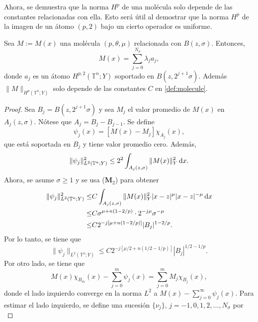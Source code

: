 Ahora, se demuestra que la norma $H^p$ de una molécula solo depende de las constantes relacionadas con ella. Esto será útil al demostrar que la norma $H^p$ de la imagen de un átomo $(p, 2)$ bajo un cierto operador es uniforme.
\begin{lemma}
	Sea $M:=M(x)$ una molécula $(p, \theta, \mu)$ relacionada con $B(z, \sigma)$. Entonces, 
	\begin{equation*}
		M(x)=\sum_{j=0}^{N_\sigma} \lambda_j a_j,
	\end{equation*}
	donde $a_j$ es un átomo $H^{p,2}(\mathbb{T}^n;Y)$ soportado en $B(z, 2^{j+1}\sigma)$. Además $\|M\|_{H^p(\mathbb{T}^n; Y)}$ solo depende de las constantes $C$ en \cref{def:molecule}.
	\label{lem:M-in-Hp}
\end{lemma}

\begin{proof}
	Sea $B_j = B(z, 2^{j+1}\sigma)$ y sea $M_j$ el valor promedio de $M(x)$ en $A_j(z, \sigma)$. Nótese que $A_j = B_j - B_{j-1}$. Se define 
	\begin{equation*}
		\psi_j(x) = [M(x)-M_j]\chi_{A_j}(x),
	\end{equation*}
	que está soportada en $B_j$ y tiene valor promedio cero. Además, 
	\begin{equation*}
		\|\psi_j\|_{L^2(\mathbb{T}^n;Y)}^2 \leq 2^2 \int_{A_j(z,\sigma)}\|M(x)\|_Y^2 \mathop{}\!\mathrm{d} x.
	\end{equation*}
	Ahora, se asume $\sigma\geq1$ y se usa ($\mathbf{M}_2$) para obtener
	\begin{align*}
		\|\psi_j\|_{L^2(\mathbb{T}^n;Y)}^2 \leq & C \int_{A_j(z,\sigma)}\|M(x)\|_Y^2|x-z|^{\mu} |x-z|^{-\mu} \mathop{}\!\mathrm{d} x
		\\
		\leq & C\sigma^{\mu+n(1-2/p)}\cdot2^{-j\mu} \sigma^{-\mu}
		\\
		\leq & C 2^{-j[\mu + n(1-2/p)]} |B_j|^{1-2/p}.
	\end{align*}
	Por lo tanto, se tiene que 
	\begin{equation}
		\|\psi_j\|_{L^2(\mathbb{T}^n;Y)} \leq C 2^{-j[\mu/2 + n(1/2-1/p)]} |B_j|^{1/2-1/p}.
		\label{eq:psi-j}
	\end{equation}
	Por otro lado, se tiene que
	\begin{equation*}
		M(x)\chi_{B_m}(x) - \sum_{j=0}^m\psi_j(x) = \sum_{j=0}^mM_j\chi_{B_j}(x),
	\end{equation*}
	donde el lado izquierdo converge en la norma $L^2$ a $M(x) -\sum_{j=0}^\infty\psi_j(x)$. Para estimar el lado izquierdo, se define una sucesión $\{\nu_j\}$, $j=-1, 0, 1, 2,...,N_\sigma$ por
	\begin{equation*}

\end{equation*}
\end{proof}
